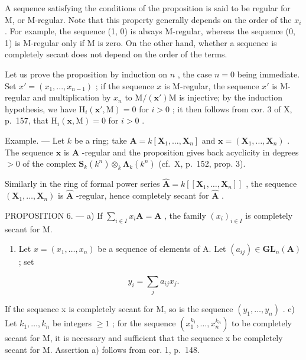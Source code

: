 A sequence satisfying the conditions of the proposition is said to be regular for M, or M-regular. Note that this property generally depends on the order of the \(x_i\) . For example, the sequence (1, 0) is always M-regular, whereas the sequence (0, 1) is M-regular only if M is zero. On the other hand, whether a sequence is completely secant does not depend on the order of the terms.

Let us prove the proposition by induction on \(n\) , the case \(n=0\) being immediate. Set \(x'=(x_{1},...,x_{n-1})\) ; if the sequence \(x\) is M-regular, the sequence \(x'\) is M-regular and multiplication by \(x_{n}\) to \(\mathrm{M}/(\mathbf{x}')\mathrm{M}\) is injective; by the induction hypothesis, we have \(\mathrm{H}_{i}(\mathbf{x}',\mathrm{M})=0\) for \(i>0\) ; it then follows from cor. 3 of X, p.~157, that \(\mathrm{H}_{i}(\mathbf{x},\mathrm{M})=0\) for \(i>0\) .

Example. --- Let \(k\) be a ring; take \(\mathbf{A} = k[\mathbf{X}_1, \ldots, \mathbf{X}_n]\) and \(\boldsymbol{x} = (\mathbf{X}_1, \ldots, \mathbf{X}_n)\) . The sequence \(\boldsymbol{x}\) is \(\mathbf{A}\) -regular and the proposition gives back acyclicity in degrees \(>0\) of the complex \(\mathbf{S}_k(k^n) \otimes_k \boldsymbol{\Lambda}_k(k^n)\) (cf.~X, p.~152, prop. 3).

Similarly in the ring of formal power series \(\hat{\mathbf{A}} = k[[\mathbf{X}_1, \ldots, \mathbf{X}_n]]\) , the sequence \((\mathbf{X}_1, \ldots, \mathbf{X}_n)\) is \(\hat{\mathbf{A}}\) -regular, hence completely secant for \(\hat{\mathbf{A}}\) .

PROPOSITION 6. --- a) If \(\sum_{i\in I}x_i\mathbf{A} = \mathbf{A}\) , the family \((x_i)_{i\in I}\) is completely secant for M.

\begin{enumerate}
\def\labelenumi{\alph{enumi})}
\setcounter{enumi}{1}
\tightlist
\item
  Let \(x = (x_1, \ldots, x_n)\) be a sequence of elements of A. Let \((a_{ij}) \in \mathbf{GL}_n(\mathbf{A})\) ; set
\end{enumerate}

\[
y _ {i} = \sum_ {j} a _ {i j} x _ {j}.
\]

If the sequence x is completely secant for M, so is the sequence \((y_{1}, \ldots, y_{n})\) . c) Let \(k_{1}, \ldots, k_{n}\) be integers \(\geqslant 1\) ; for the sequence \((x_{1}^{k_{1}}, \ldots, x_{n}^{k_{n}})\) to be completely secant for M, it is necessary and sufficient that the sequence x be completely secant for M. Assertion a) follows from cor. 1, p.~148.

